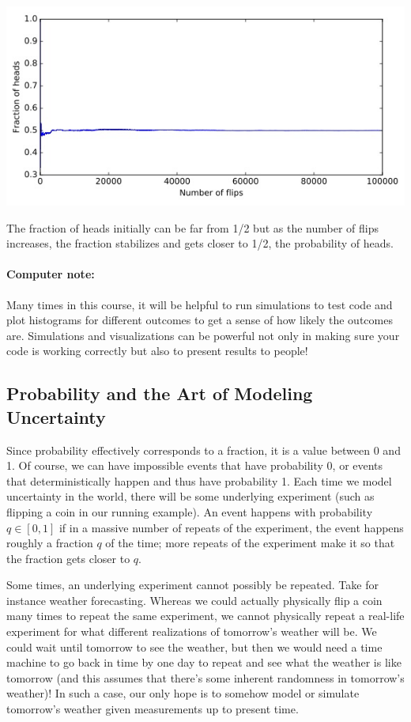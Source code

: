 \documentclass[6008notes.tex]{subfiles}
\begin{document}
{\centering\includegraphics[scale=0.5]{images_sec-intro-frequency-of-heads-vs-number-of-flips} \par}

The fraction of heads initially can be far from 1/2 but as the number of flips increases, the fraction stabilizes and gets closer to 1/2, the probability of heads.

\paragraph{Computer note:} Many times in this course, it will be helpful to run simulations to test code and plot histograms for different outcomes to get a sense of how likely the outcomes are. Simulations and visualizations can be powerful not only in making sure your code is working correctly but also to present results to people!

\subsection{Probability and the Art of Modeling Uncertainty}
Since probability effectively corresponds to a fraction, it is a value between 0 and 1. Of course, we can have impossible events that have probability 0, or events that deterministically happen and thus have probability 1. Each time we model uncertainty in the world, there will be some underlying experiment (such as flipping a coin in our running example). An event happens with probability $q \in [0,1]$ if in a massive number of repeats of the experiment, the event happens roughly a fraction $q$ of the time; more repeats of the experiment make it so that the fraction gets closer to $q$.

Some times, an underlying experiment cannot possibly be repeated. Take for instance weather forecasting. Whereas we could actually physically flip a coin many times to repeat the same experiment, we cannot physically repeat a real-life experiment for what different realizations of tomorrow's weather will be. We could wait until tomorrow to see the weather, but then we would need a time machine to go back in time by one day to repeat and see what the weather is like tomorrow (and this assumes that there's some inherent randomness in tomorrow's weather)! In such a case, our only hope is to somehow model or simulate tomorrow's weather given measurements up to present time.
\end{document}
